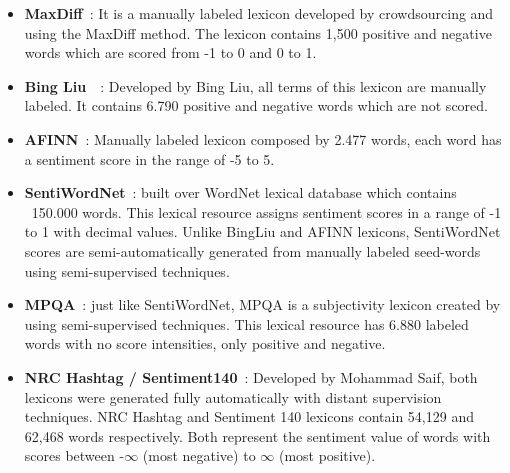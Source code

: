 \begin{itemize} 
\itemsep0em  

\item \textbf{MaxDiff}~\cite{kiritchenko2014sentiment}: It is a manually labeled lexicon developed by crowdsourcing and using the MaxDiff method. The lexicon contains 1,500 positive and negative words which are scored from -1 to 0 and 0 to 1.

\item \textbf{Bing Liu}~\cite{hu2004mining}~\cite{liu2005opinion}: Developed by Bing Liu, all terms of this lexicon are manually labeled. It contains 6.790 positive and negative words which are not scored.

\item  \textbf{AFINN}~\cite{nielsen2011new}: Manually labeled lexicon composed by 2.477 words, each word has a sentiment score in the range of -5 to 5. 

\item \textbf{SentiWordNet}~\cite{esuli2006sentiwordnet}: built over WordNet lexical database which contains ~150.000 words. This lexical resource assigns sentiment scores in a range of -1 to 1 with decimal values. Unlike BingLiu and AFINN lexicons, SentiWordNet scores are semi-automatically generated from manually labeled seed-words using  semi-supervised techniques. 

\item \textbf{MPQA}~\cite{wilson2005recognizing}: just like SentiWordNet, MPQA is a subjectivity lexicon created by using semi-supervised techniques. This lexical resource has 6.880 labeled words with no score intensities, only positive and negative.   

\item \textbf{NRC Hashtag / Sentiment140}~\cite{NRCJAIR14}: Developed by Mohammad Saif, both lexicons were generated fully automatically with distant supervision techniques. NRC Hashtag and Sentiment 140 lexicons contain 54,129 and 62,468 words respectively. Both represent the sentiment value of words with scores between -$\infty$ (most negative) to $\infty$ (most positive).


\end{itemize}

